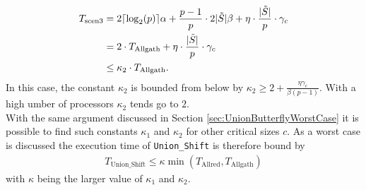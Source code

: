 \begin{align*}
	T_\mathrm{scen3} &= 2 \lceil\log_2(p)\rceil\alpha 
	+ \frac{p-1}{p}\cdot 2 |\tilde{S}| \beta
	+ \eta \cdot \frac{|\Tilde{S}|}{p} \cdot \gamma_c \\
	&= 2 \cdot T_\mathrm{Allgath} + \eta \cdot \frac{|\Tilde{S}|}{p} \cdot \gamma_c \\
	&\leq \kappa_2 \cdot T_\mathrm{Allgath}.
\end{align*}
In this case, the constant $\kappa_2$ is bounded from below by $\kappa_2 \geq 2 + \frac{\eta \gamma_c}{\beta(p-1)}$. With a high umber of processors $\kappa_2$ tends go to $2$.\\
With the same argument discussed in Section \ref{sec:UnionButterflyWorstCase} it is possible to find such constants $\kappa_1$ and $\kappa_2$ for other critical sizes $c$. As a worst case is discussed the execution time of \texttt{Union\_Shift} is therefore bound by 
\begin{align*}
	T_\mathrm{Union\_Shift} \leq \kappa \min(T_\mathrm{Allred}, T_\mathrm{Allgath})
\end{align*}
with $\kappa$ being the larger value of $\kappa_1$ and $\kappa_2$.

